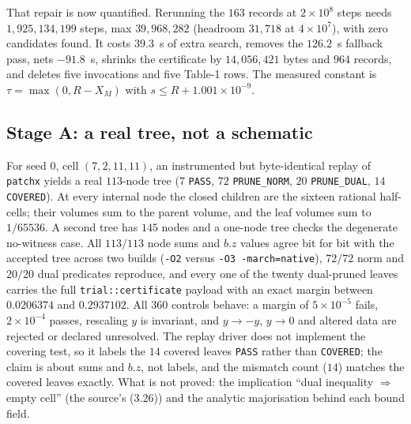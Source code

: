 \documentclass[10pt]{article}
\theoremstyle{definition}
\newcommand{\file}[1]{\texttt{\small #1}}
\begin{document}
That repair is now quantified. Rerunning the $163$ records at $2\times10^8$ steps needs
$1{,}925{,}134{,}199$ steps, max $39{,}968{,}282$ (headroom $31{,}718$ at $4\times10^7$), with zero
candidates found. It costs $39.3$~s of extra search, removes the $126.2$~s fallback pass, nets
$-91.8$~s, shrinks the certificate by $14{,}056{,}421$ bytes and $964$ records, and deletes five
invocations and five Table-1 rows. The measured constant is $\tau=\max(0,R-X_M)$ with
$s\le R+1.001\times10^{-9}$.

\subsection{Stage A: a real tree, not a schematic}\label{sec:stagea}
For seed $0$, cell $(7,2,11,11)$, an instrumented but byte-identical replay of \file{patchx} yields a
real $113$-node tree ($7$ \texttt{PASS}, $72$ \texttt{PRUNE\_NORM}, $20$ \texttt{PRUNE\_DUAL},
$14$ \texttt{COVERED}). At every internal node the closed children are the sixteen rational half-cells;
their volumes sum to the parent volume, and the leaf volumes sum to $1/65536$. A second tree has $145$
nodes and a one-node tree checks the degenerate no-witness case. All $113/113$ node sums and $b.z$
values agree bit for bit with the accepted tree across two builds (\texttt{-O2} versus
\texttt{-O3 -march=native}), $72/72$ norm and $20/20$ dual predicates reproduce, and every one of the
twenty dual-pruned leaves carries the full \file{trial::certificate} payload with an exact margin
between $0.0206374$ and $0.2937102$. All $360$ controls behave: a margin of $5\times10^{-5}$ fails,
$2\times10^{-4}$ passes, rescaling $y$ is invariant, and $y\to-y$, $y\to0$ and altered data are
rejected or declared unresolved. The replay driver does not implement the covering test, so it labels
the $14$ covered leaves \texttt{PASS} rather than \texttt{COVERED}; the claim is about sums and $b.z$,
not labels, and the mismatch count ($14$) matches the covered leaves exactly. What is not proved: the
implication ``dual inequality $\Rightarrow$ empty cell'' (the source's (3.26)) and the analytic
majorisation behind each bound field.
\end{document}
